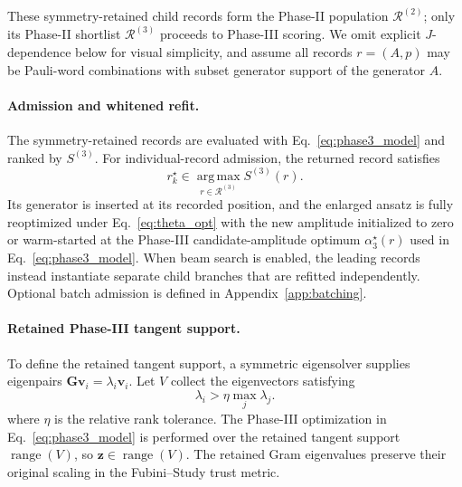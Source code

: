 \documentclass[
  reprint,
  amsmath,
  amssymb,
  aps,
  pra,
  nofootinbib,
  superscriptaddress,
  floatfix
]{revtex4-2}
\begin{document}
These symmetry-retained child records form the Phase-II population
\(\mathcal R^{(2)}\); only its Phase-II shortlist \(\mathcal R^{(3)}\)
proceeds to Phase-III scoring. We omit explicit
\(J\)-dependence below for visual simplicity, and assume all records
\(r=(A,p)\) may be Pauli-word combinations with subset generator support of
the generator \(A\).

\paragraph*{Admission and whitened refit.}
%
The symmetry-retained records are evaluated with
Eq.~\eqref{eq:phase3_model} and ranked by \(S^{(3)}\). For individual-record
admission, the returned record satisfies
\begin{equation*}
r_k^\star
\in
\operatorname*{arg\,max}_{r\in\mathcal R^{(3)}}S^{(3)}(r).
\end{equation*}
Its generator is inserted at its recorded position, and the enlarged ansatz is
fully reoptimized under Eq.~\eqref{eq:theta_opt} with the new amplitude
initialized to zero or warm-started at the Phase-III candidate-amplitude
optimum \(\alpha_3^\star(r)\) used in Eq.~\eqref{eq:phase3_model}. When beam
search is enabled, the leading records instead instantiate separate child
branches that are refitted independently.
Optional batch admission is defined in Appendix~\ref{app:batching}.

\paragraph*{Retained Phase-III tangent support.}
%
To define the retained tangent support, a symmetric eigensolver supplies
eigenpairs \(\mathbf G\mathbf v_i=\lambda_i\mathbf v_i\). Let \(V\) collect
the eigenvectors satisfying
\begin{equation}
\lambda_i>\eta\max_j\lambda_j.
\label{eq:phase3_support_threshold}
\end{equation}
where \(\eta\) is the relative rank tolerance. The Phase-III optimization in
Eq.~\eqref{eq:phase3_model} is performed over the retained tangent support
\(\operatorname{range}(V)\), so
\(\mathbf z\in\operatorname{range}(V)\). The retained Gram eigenvalues
preserve their original scaling in the Fubini--Study trust metric.
\end{document}
